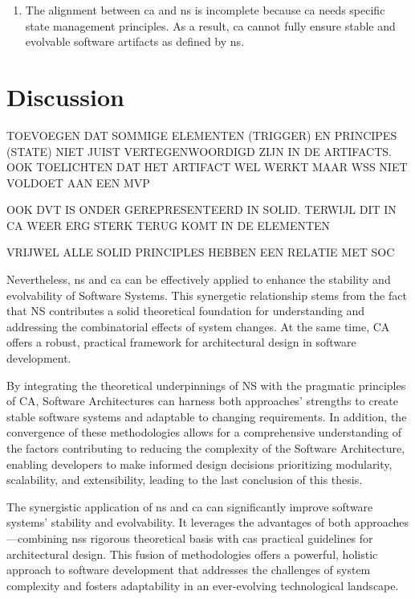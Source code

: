 \begin{enumerate}[leftmargin=*]
    \item The alignment between \gls{ca} and \gls{ns} is incomplete because \gls{ca} needs
    specific state management principles. As a result, \gls{ca} cannot fully ensure stable and
    evolvable software artifacts as defined by \gls{ns}.
\end{enumerate}

\section{Discussion}

TOEVOEGEN DAT SOMMIGE ELEMENTEN (TRIGGER) EN PRINCIPES (STATE) NIET JUIST VERTEGENWOORDIGD
ZIJN IN DE ARTIFACTS. OOK TOELICHTEN DAT HET ARTIFACT WEL WERKT MAAR WSS NIET VOLDOET AAN
EEN MVP

OOK DVT IS ONDER GEREPRESENTEERD IN SOLID. TERWIJL DIT IN CA WEER ERG STERK TERUG KOMT IN
DE ELEMENTEN

VRIJWEL ALLE SOLID PRINCIPLES HEBBEN EEN RELATIE MET SOC

Nevertheless, \gls{ns} and \gls{ca} can be effectively applied to enhance the stability and evolvability
of Software Systems. This synergetic relationship stems from the fact that NS contributes
a solid theoretical foundation for understanding and addressing the combinatorial effects
of system changes. At the same time, CA offers a robust, practical framework for
architectural design in software development.

By integrating the theoretical underpinnings of NS with the pragmatic principles of CA,
Software Architectures can harness both approaches' strengths to create stable software
systems and adaptable to changing requirements. In addition, the convergence of these
methodologies allows for a comprehensive understanding of the factors contributing to
reducing the complexity of the Software Architecture, enabling developers to make informed
design decisions prioritizing modularity, scalability, and extensibility, leading to the
last conclusion of this thesis.

The synergistic application of \gls{ns} and \gls{ca} can significantly improve software
systems' stability and evolvability. It leverages the advantages of both
approaches—combining \glspl{ns} rigorous theoretical basis with \glspl{ca} practical
guidelines for architectural design. This fusion of methodologies offers a powerful,
holistic approach to software development that addresses the challenges of system
complexity and fosters adaptability in an ever-evolving technological landscape.


